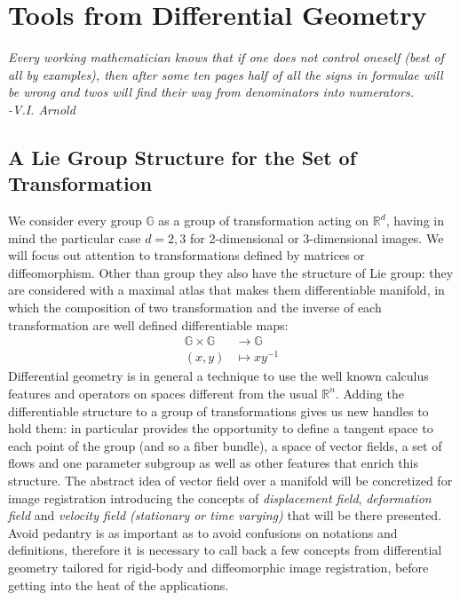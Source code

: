 \chapter{Tools from Differential Geometry}\label{ch:tools}

\begin{flushright}
	\emph{Every working mathematician knows that if one does not control oneself (best of all by examples), then after some ten pages half of all the signs in formulae will be wrong and twos will find their way from denominators into numerators. \\ -V.I. Arnold}
\end{flushright}

\section{A Lie Group Structure for the Set of Transformation}\label{se:finite_lie_group}

We consider every group $\mathbb{G}$ as a group of transformation acting on $\mathbb{R}^{d}$, having in mind the particular case $d=2,3$ for 2-dimensional or 3-dimensional images.
We will focus out attention to transformations defined by matrices or diffeomorphism. Other than group they also have the structure of Lie group: they are considered with a maximal atlas that makes them differentiable manifold, in which the composition of two transformation and the inverse of each transformation are well defined differentiable maps:
\begin{align*}
\mathbb{G} \times \mathbb{G} & \longrightarrow  \mathbb{G}    \\
(x,y) &\longmapsto  x y^{-1}
\end{align*}
Differential geometry is in general a technique to use the well known calculus features and operators on spaces different from the usual $\mathbb{R}^{n}$. Adding the differentiable structure to a group of transformations gives us new handles to hold them: in particular provides the opportunity to define a tangent space to each point of the group (and so a fiber bundle), a space of vector fields, a set of flows and one parameter subgroup as well as other features that enrich this structure. The abstract idea of vector field over a manifold will be concretized for image registration introducing the concepts of \emph{displacement field}, \emph{deformation field} and \emph{velocity field (stationary or time varying)} that will be there presented. Avoid pedantry is as important as to avoid confusions on notations and definitions, therefore it is necessary to call back a few concepts from differential geometry tailored for rigid-body and diffeomorphic image registration, before getting into the heat of the applications. 

